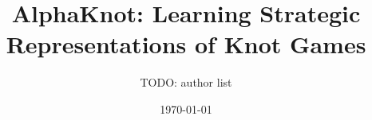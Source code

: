 \documentclass[11pt]{article}
\title{AlphaKnot: Learning Strategic Representations of Knot Games}
\author{TODO: author list}
\date{\today}
\begin{document}
\maketitle

\begin{abstract}

\end{abstract}










\end{document}
